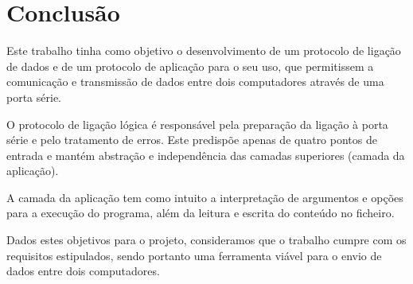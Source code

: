 \section{Conclusão}

Este trabalho tinha como objetivo o desenvolvimento de um protocolo de ligação de dados e de um protocolo de aplicação para o seu uso, que permitissem a comunicação e transmissão de dados entre dois computadores através de uma porta série.  

O protocolo de ligação lógica é responsável pela preparação da ligação à porta série e pelo tratamento de erros. Este predispõe apenas de quatro pontos de entrada e mantém abstração e independência das camadas superiores (camada da aplicação). 

A camada da aplicação tem como intuito a interpretação de argumentos e opções para a execução do programa, além da leitura e escrita do conteúdo no ficheiro. 

Dados estes objetivos para o projeto, consideramos que o trabalho cumpre com os requisitos estipulados, sendo portanto uma ferramenta viável para o envio de dados entre dois computadores.